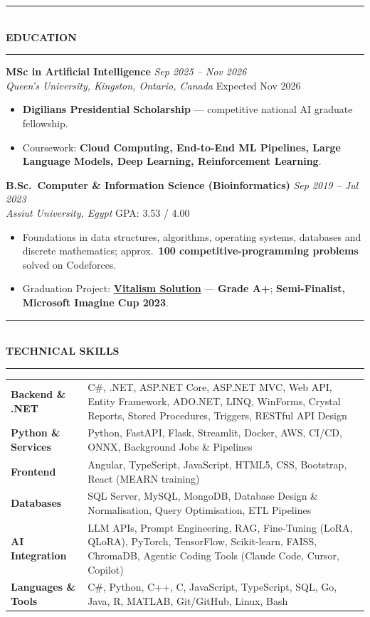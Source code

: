 \documentclass[10pt, a4paper]{article}
\newcommand{\cvsection}[1]{%
  \vspace{3pt}%
  {\color{navy}\rule{\linewidth}{1.1pt}}\\[0.5pt]%
  {\color{navy}\bfseries\fontsize{9.5}{11}\selectfont\uppercase{#1}}\\[-4pt]%
  {\color{teal}\rule{\linewidth}{0.6pt}}%
  \vspace{2pt}%
}
\newcommand{\cventry}[4]{%
  \vspace{2.5pt}%
  \textbf{\color{darkgray}#1} \hfill {\color{midgray}\textit{#3}}\\[-1.5pt]%
  {\color{teal}\textit{#2}} \hfill {\color{midgray}#4}%
}
\newenvironment{cvitems}{%
  \begin{itemize}[leftmargin=11pt, itemsep=0.5pt, parsep=0pt, topsep=1pt,
                  label={\textcolor{teal}{$\bullet$}}]
}{%
  \end{itemize}%
}
\begin{document}
\cvsection{Education}

\cventry{MSc in Artificial Intelligence}{Queen's University, Kingston, Ontario, Canada}
        {Sep 2025 -- Nov 2026}{Expected Nov 2026}
\begin{cvitems}
  \item \textbf{Digilians Presidential Scholarship} --- competitive national AI graduate fellowship.
  \item Coursework: \textbf{Cloud Computing, End-to-End ML Pipelines, Large Language Models, Deep Learning, Reinforcement Learning}.
\end{cvitems}

\cventry{B.Sc.\ Computer \& Information Science (Bioinformatics)}{Assiut University, Egypt}
        {Sep 2019 -- Jul 2023}{GPA: 3.53 / 4.00}
\begin{cvitems}
  \item Foundations in data structures, algorithms, operating systems, databases and discrete mathematics; approx.\ \textbf{100 competitive-programming problems} solved on Codeforces.
  \item Graduation Project: \href{https://vitalismsolution.github.io/}{\textbf{Vitalism Solution}} --- \textbf{Grade A+}; \textbf{Semi-Finalist, Microsoft Imagine Cup 2023}.
\end{cvitems}

\cvsection{Technical Skills}

\renewcommand{\arraystretch}{1.1}
\begin{tabularx}{\linewidth}{@{}>{\raggedright\hyphenpenalty=10000\arraybackslash}p{35mm} X@{}}
\textbf{Backend \& .NET} &
C\#, .NET, ASP.NET Core, ASP.NET MVC, Web API, Entity Framework, ADO.NET, LINQ, WinForms, Crystal Reports, Stored Procedures, Triggers, RESTful API Design \\

\textbf{Python \& Services} &
Python, FastAPI, Flask, Streamlit, Docker, AWS, CI/CD, ONNX, Background Jobs \& Pipelines \\

\textbf{Frontend} &
Angular, TypeScript, JavaScript, HTML5, CSS, Bootstrap, React (MEARN training) \\

\textbf{Databases} &
SQL Server, MySQL, MongoDB, Database Design \& Normalisation, Query Optimisation, ETL Pipelines \\

\textbf{AI Integration} &
LLM APIs, Prompt Engineering, RAG, Fine-Tuning (LoRA, QLoRA), PyTorch, TensorFlow, Scikit-learn, FAISS, ChromaDB, Agentic Coding Tools (Claude Code, Cursor, Copilot) \\

\textbf{Languages \& Tools} &
C\#, Python, C++, C, JavaScript, TypeScript, SQL, Go, Java, R, MATLAB, Git/GitHub, Linux, Bash \\
\end{tabularx}
\end{document}
